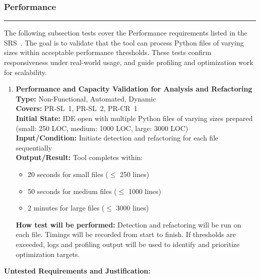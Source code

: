 \documentclass[12pt, titlepage]{article}
\newcommand{\colorrule}{\textcolor{BlueViolet}{\rule{\linewidth}{2pt}}}
\begin{document}
\subsubsection{Performance}
\colorrule

\medskip

\noindent
The following subsection tests cover the Performance requirements listed in the SRS~\cite{SRS}. The goal is to validate that the tool can process Python files of varying sizes within acceptable performance thresholds. These tests confirm responsiveness under real-world usage, and guide profiling and optimization work for scalability.

\begin{enumerate}[label={\bf \textcolor{Maroon}{test-PF-\arabic*}}, wide=0pt, font=\itshape]
    
  \item \textbf{Performance and Capacity Validation for Analysis and Refactoring} \\[2mm]
    \textbf{Type:} Non-Functional, Automated, Dynamic \\
    \textbf{Covers:} PR-SL~1, PR-SL~2, PR-CR~1 \\
    \textbf{Initial State:} IDE open with multiple Python files of varying sizes prepared (small: 250 LOC, medium: 1000 LOC, large: 3000 LOC) \\
    \textbf{Input/Condition:} Initiate detection and refactoring for each file sequentially \\
    \textbf{Output/Result:} Tool completes within: 
    \begin{itemize}
      \item 20 seconds for small files ($\leq$ 250 lines)
      \item 50 seconds for medium files ($\leq$ 1000 lines)
      \item 2 minutes for large files ($\leq$ 3000 lines)
    \end{itemize}
    \textbf{How test will be performed:} Detection and refactoring will be run on each file. Timings will be recorded from start to finish. If thresholds are exceeded, logs and profiling output will be used to identify and prioritize optimization targets.

\end{enumerate}

\medskip

\noindent \textbf{Untested Requirements and Justification:}
\end{document}
